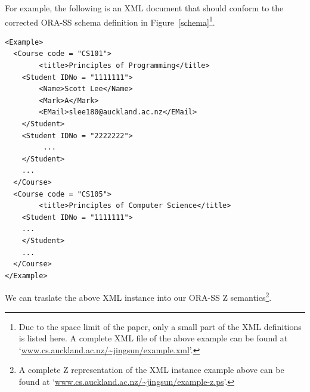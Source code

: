 \documentclass{entcs}
\begin{document}
For example, the following is an XML document that should conform
to the corrected ORA-SS schema definition in
Figure~\ref{schema}\footnote{Due to the space limit of the paper,
only a small part of the XML definitions is listed here. A
complete XML file of the above example can be found at
`\url{www.cs.auckland.ac.nz/~jingsun/example.xml}'.}.
\begin{footnotesize}
\begin{verbatim}<Example>
  <Course code = "CS101">
        <title>Principles of Programming</title>
    <Student IDNo = "1111111">
        <Name>Scott Lee</Name>
        <Mark>A</Mark>
        <EMail>slee180@auckland.ac.nz</EMail>
    </Student>
    <Student IDNo = "2222222">
         ...
    </Student>
    ...
  </Course>
  <Course code = "CS105">
        <title>Principles of Computer Science</title>
    <Student IDNo = "1111111">
    ...
    </Student>
    ...
  </Course>
</Example>\end{verbatim}
\end{footnotesize}
We can traslate the above XML instance into our ORA-SS Z
semantics\footnote{A complete Z representation of the XML instance
example above can be found at
`\url{www.cs.auckland.ac.nz/~jingsun/example-z.ps}'.}.
\end{document}
